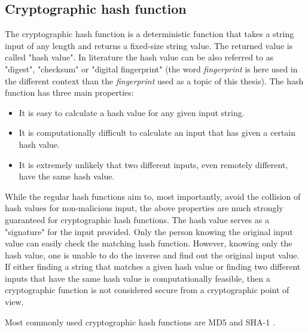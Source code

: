 \subsection{Cryptographic hash function}
The cryptographic hash function is a deterministic function that takes a string input of any length and returns a fixed-size string value. 
The returned value is called "hash value". 
In literature the hash value can be also referred to as "digest", "checksum" or "digital fingerprint" (the word \textit{fingerprint} is here used in the different context than the \textit{fingerprint} used as a topic of this thesis).
The hash function has three main properties:
\begin{itemize}
    \item It is easy to calculate a hash value for any given input string.
    \item It is computationally difficult to calculate an input that has given a certain hash value.
    \item It is extremely unlikely that two different inputs, even remotely different, have the same hash value.
\end{itemize}

While the regular hash functions aim to, most importantly, avoid the collision of hash values for non-malicious input, the above properties are much strongly guaranteed for cryptographic hash functions.  
The hash value serves as a "signature" for the input provided.
Only the person knowing the original input value can easily check the matching hash function. 
However, knowing only the hash value, one is unable to do the inverse and find out the original input value. 
If either finding a string that matches a given hash value or finding two different inputs that have the same hash value is computationally feasible, then a cryptographic function is not considered secure from a cryptographic point of view.

Most commonly used cryptographic hash functions are MD5 \cite{rivest1992md5} and SHA-1 \cite{eastlake2001us}.


